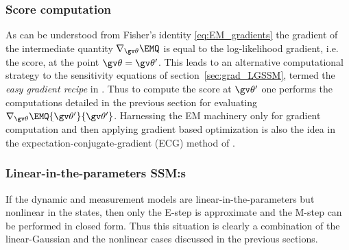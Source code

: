 \subsubsection{Score computation}\label{sec:fisheri}%

As can be understood from Fisher's identity \eqref{eq:EM_gradients}
the gradient of the intermediate quantity $\nabla_{\Th}\EMQ$ is equal to the log-likelihood
gradient, i.e. the score, at the point $\Th=\Th'$. This leads to an alternative computational
strategy to the sensitivity equations of section~\ref{sec:grad_LGSSM}, termed
the \emph{easy gradient recipe} in \textcite{Olsson2007}. Thus to compute the score
at $\Th'$ one performs the computations detailed in the previous section for evaluating
$\nabla_{\Th}\EMQ{\Th'}{\Th'}$. Harnessing the EM machinery only for gradient computation and then applying
gradient based optimization is also the idea in the expectation-conjugate-gradient (ECG) 
method of \textcite{Salakhutdinov2003a}. 


\subsubsection*{Linear-in-the-parameters SSM:s}%
\label{sec:litp}

If the dynamic and measurement models are linear-in-the-parameters but nonlinear
in the states, then only the E-step is approximate and the M-step can be performed
in closed form. Thus this situation is clearly a combination of the linear-Gaussian
and the nonlinear cases discussed in the previous sections.

